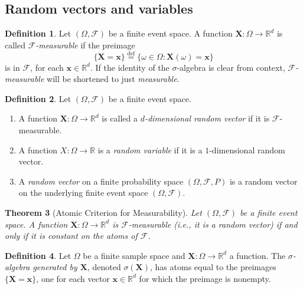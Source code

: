 \documentclass[reqno]{amsart}
\newtheorem{thm}{Theorem}[section]
\theoremstyle{definition}
\newtheorem{defn}[thm]{Definition}
\numberwithin{equation}{section}
\begin{document}
\subsection{Random vectors and variables}

\begin{defn}
Let $(\Omega, \mathcal{F})$ be a finite event space. A function $\mathbf{X}: \Omega \to \mathbb{R}^d$ is called \textit{$\mathcal{F}$-measurable} if the preimage
	\[
	\{\mathbf{X} = \mathbf{x}\} \stackrel{\text{def}}{=} \{ \omega \in \Omega : \mathbf{X}(\omega)=\mathbf{x}\}
	\]
is in $\mathcal{F}$, for each $\mathbf{x}\in \mathbb{R}^d$. If the identity of the $\sigma$-algebra is clear from context, \textit{$\mathcal{F}$-measurable} will be shortened to just \textit{measurable}.
\end{defn}

\begin{defn}
Let $(\Omega, \mathcal{F})$ be a finite event space.
\begin{enumerate}
\item A function $\mathbf{X}: \Omega \to \mathbb{R}^d$ is called a \textit{$d$-dimensional random vector} if it is $\mathcal{F}$-measurable.
\item A function $X: \Omega \to \mathbb{R}$ is a \textit{random variable} if it is a $1$-dimensional random vector.
\item A \textit{random vector} on a finite probability space $(\Omega, \mathcal{F}, P)$ is a random vector on the underlying finite event space $(\Omega, \mathcal{F})$.
\end{enumerate}
\end{defn}

\begin{thm}[Atomic Criterion for Measurability]\label{thm:atomic-criterion-measurable}
Let $(\Omega, \mathcal{F})$ be a finite event space. A function $\mathbf{X}: \Omega \to \mathbb{R}^d$ is $\mathcal{F}$-measurable (i.e., it is a random vector) if and only if it is constant on the atoms of $\mathcal{F}$.
\end{thm}

\begin{defn}
Let $\Omega$ be a finite sample space and $\mathbf{X}: \Omega \to \mathbb{R}^d$ a function. The \textit{$\sigma$-algebra generated by $\mathbf{X}$}, denoted $\sigma(\mathbf{X})$, has atoms equal to the preimages $\{\mathbf{X} = \mathbf{x}\}$, one for each vector $\mathbf{x}\in \mathbb{R}^d$ for which the preimage is nonempty.
\end{defn}
\end{document}
